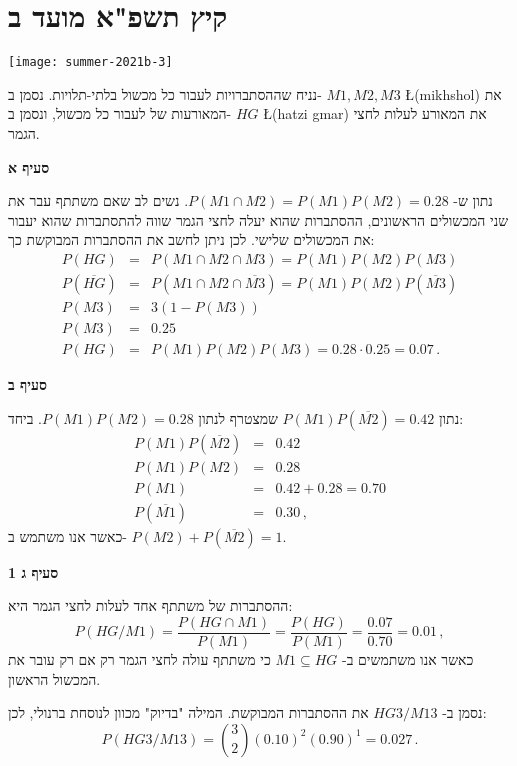 

\section{קיץ תשפ"א מועד ב}

\begin{center}
\texttt{[image: summer-2021b-3]}
\end{center}

נניח שההסתברויות לעבור כל מכשול בלתי-תלויות. נסמן ב-%
$M1, M2, M3$ \L{(mikhshol)}
את המאורעות של לעבור כל מכשול, ונסמן ב-%
$HG$ \L{(hatzi gmar)}
את המאורע לעלות לחצי הגמר.

\textbf{סעיף א}

נתון ש-%
$P(M1 \cap M2)=P(M1)P(M2)=0.28$.
נשים לב שאם משתתף עבר את שני המכשולים הראשונים, ההסתברות שהוא יעלה לחצי הגמר שווה להתסתברות שהוא יעבור את המכשולים שלישי. לכן ניתן לחשב את ההסתברות המבוקשת כך:
\begin{eqnarray*}
P(HG)&=& P(M1\cap M2 \cap M3) = P(M1)P(M2)P(M3)\\
P(\overline{HG})&=& P(M1\cap M2 \cap \overline{M3}) = P(M1)P(M2)P(\overline{M3})\\
P(M3)&=&3(1-P(M3))\\
P(M3)&=&0.25\\
P(HG)&=&P(M1)P(M2)P(M3)=0.28\cdot 0.25=0.07\,.
\end{eqnarray*}

\textbf{סעיף ב}

נתון
$P(M1)P(\overline{M2})=0.42$
שמצטרף לנתון
$P(M1)P(M2)=0.28$.
ביחד:
\begin{eqnarray*}
P(M1)P(\overline{M2})&=&0.42\\
P(M1)P(M2)&=&0.28\\
P(M1)&=&0.42+0.28=0.70\\
P(\overline{M1})&=&0.30\,,
\end{eqnarray*}
כאשר אנו משתמש ב-%
$P(M2)+P(\overline{M2})=1$.

\textbf{סעיף ג 1}

ההסתברות של משתתף אחד לעלות לחצי הגמר היא:
\[
P(HG/M1)=\frac{P(HG\cap M1)}{P(M1)}=\frac{P(HG)}{P(M1)}=
\frac{0.07}{0.70}=0.01\,,
\]
כאשר אנו משתמשים ב-%
$M1 \subseteq HG$
כי משתתף עולה לחצי הגמר רק אם רק עובר את המכשול הראשון.

נסמן ב-%
$HG3/M13$
את ההסתברות המבוקשת. המילה "בדיוק" מכוון לנוסחת ברנולי, לכן:
\[
P(HG3/M13)={3\choose 2}\left(0.10\right)^2\left(0.90\right)^1=0.027\,.
\]

